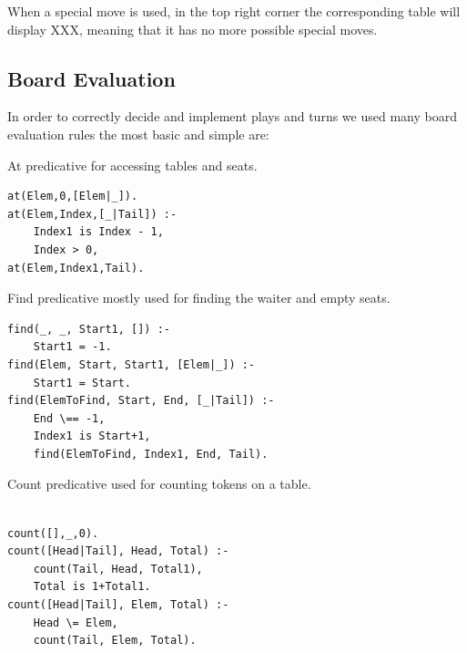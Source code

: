 \documentclass[a4paper]{article}
\begin{document}
When a special move is used, in the top right corner the corresponding table
 will display XXX, meaning that it has no more possible special moves.

\subsection{Board Evaluation}

In order to correctly decide and implement plays and turns we used many board evaluation rules the most basic and simple are:

        \begin{listing}[H]
            \caption{At predicative for accessing tables and seats.}
            \label{Codigo:cod_at}
            \begin{verbatim}
at(Elem,0,[Elem|_]).
at(Elem,Index,[_|Tail]) :-
    Index1 is Index - 1,
    Index > 0,
at(Elem,Index1,Tail).

    \end{verbatim}

    \end{listing}


        \begin{listing}[H]
        \caption{Find predicative mostly used for finding the waiter and empty seats.}
        \label{Codigo:cod_find}
        \begin{verbatim}
find(_, _, Start1, []) :-
    Start1 = -1.
find(Elem, Start, Start1, [Elem|_]) :-
    Start1 = Start.
find(ElemToFind, Start, End, [_|Tail]) :-
    End \== -1,
    Index1 is Start+1,
    find(ElemToFind, Index1, End, Tail).

        \end{verbatim}

        \end{listing}


        \begin{listing}[H]
        \caption{Count predicative used for counting tokens on a table.}
        \label{Codigo:cod_count}
        \begin{verbatim}

count([],_,0).
count([Head|Tail], Head, Total) :-
    count(Tail, Head, Total1),
    Total is 1+Total1.
count([Head|Tail], Elem, Total) :-
    Head \= Elem,
    count(Tail, Elem, Total).

        \end{verbatim}

        \end{listing}
\end{document}

